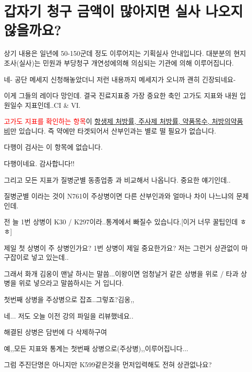 \section{갑자기 청구 금액이 많아지면 실사 나오지 않을까요?}
\begin{tcolorbox}[enhanced jigsaw,breakable,pad at break*=1mm,
  colback=blue!5!white,colframe=blue!75!black,title= 실사 나오지 않을까요?,
  watermark color=white,watermark text=실사]
\begin{description}\tightlist
\item[K :] 상기 내용은 일년에 50-150군데 정도 이루어지는 기획실사 안내입니다. 대분분의 현지조사(실사)는 민원과 부당청구 개연성에의해 의심되는 기관에 의해 이루어집니다.
\item[A :] 네- 공단 메세지 신청해놓았더니 저런 내용까지 메세지가 오니까 괜히 긴장되네요- 
\item[KK :] 이게 그들의 레이다 망인데. 결국 진료지표중 가장 중요한 축인 고가도 지표와 내원 입원일수 지표인데..CI \& VI.
\item[KK :] \textcolor{red}{고가도 지표를 확인하는 항목}이 \uline{항생제 처방률, 주사제 처방률, 약품목수, 처방의약품비}만 있습니다. 즉 약에만 타겟되어서 산부인과는 별로 떨 필요가 없습니다.
\item[KK :] 다행이 검사는 이 항목에 없습니다. 
\item[A :] 다행이네요. 감사합니다!! 
\item[KK :] 그리고 모든 지표가 질병군별 동종업종 과 비교해서 나옵니다. 중요한 얘기인데..
\item[KK :] 질병군별 이라는 것이 N761이 주상병이면 다른 산부인과와 얼마나 차이 나느냐의 문제 인데.
\item[KK :] 전 늘 1번 상병이 K30 / K297이라..통계에서 빠질수 있습니다.[이거 너무 꿀팁인데 ㅎㅎ]
\item[A :] 제일 첫 상병이 주 상병인가요? 1번 상병이 제일 중요한가요? 저는 그런거 상관없이 마구잡이로 넣고 있는데..
\item[KK :] 그래서 화개 김옹이 맨날 하시는 말씀...이왕이면 엄청날거 같은 상병을 위로 / 타과 상병을 위로 넣으라고 말씀하시는 거 입니다. 
\item[KK :] 첫번째 상병을 주상병으로 잡죠..그렇죠?김옹,,
\item[A :] 네... 저도 오늘 이전 강의 파일을 리뷰했네요.. 
\item[J :] 해결된 상병은 담번에 다 삭제하구여
\item[K :] 예,,모든 지표와 통계는 첫번째 상병으로(주상병),,이루어집니다...
\item[C :] 그럼 주진단명은 아니지만  K599같은것을 먼저입력해도 전혀 상관없나요?

\end{description}
\end{tcolorbox}

